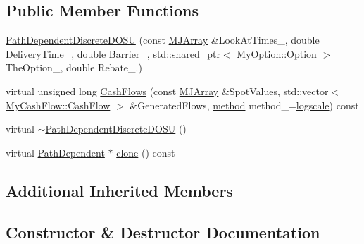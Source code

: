 \subsection*{Public Member Functions}
\begin{DoxyCompactItemize}
\item 
\hyperlink{classPathDependentDiscreteDOSU_abc7c79adca3ecf966a18e2bd94de1de4}{Path\+Dependent\+Discrete\+D\+O\+SU} (const \hyperlink{classMJArray}{M\+J\+Array} \&Look\+At\+Times\+\_\+, double Delivery\+Time\+\_\+, double Barrier\+\_\+, std\+::shared\+\_\+ptr$<$ \hyperlink{classMyOption_1_1Option}{My\+Option\+::\+Option} $>$ The\+Option\+\_\+, double Rebate\+\_.)
\item 
virtual unsigned long \hyperlink{classPathDependentDiscreteDOSU_a727544f701f7b950d52c36584c9cc006}{Cash\+Flows} (const \hyperlink{classMJArray}{M\+J\+Array} \&Spot\+Values, std\+::vector$<$ \hyperlink{classMyCashFlow_1_1CashFlow}{My\+Cash\+Flow\+::\+Cash\+Flow} $>$ \&Generated\+Flows, \hyperlink{PathDependent_8h_abed946c62f140eb7ff2ac742e6ad9497}{method} method\+\_\+=\hyperlink{PathDependent_8h_abed946c62f140eb7ff2ac742e6ad9497a064d3d3358889658ce07fe9f3191d1fd}{logscale}) const
\item 
virtual \hyperlink{classPathDependentDiscreteDOSU_ad692bd3c4251454cabc33aa632ef5f68}{$\sim$\+Path\+Dependent\+Discrete\+D\+O\+SU} ()
\item 
virtual \hyperlink{classPathDependent}{Path\+Dependent} $\ast$ \hyperlink{classPathDependentDiscreteDOSU_a69414d043a94c8fb7f95730c20a086f7}{clone} () const
\end{DoxyCompactItemize}
\subsection*{Additional Inherited Members}


\subsection{Constructor \& Destructor Documentation}
\hypertarget{classPathDependentDiscreteDOSU_abc7c79adca3ecf966a18e2bd94de1de4}{}\label{classPathDependentDiscreteDOSU_abc7c79adca3ecf966a18e2bd94de1de4} 
